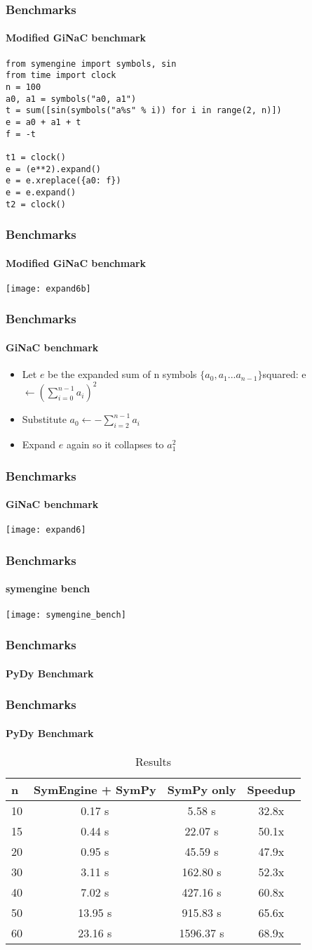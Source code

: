 \documentclass{beamer}
\begin{document}
\begin{frame}[fragile]
\frametitle{Benchmarks}
\framesubtitle{Modified GiNaC benchmark}
\begin{verbatim}
from symengine import symbols, sin
from time import clock
n = 100
a0, a1 = symbols("a0, a1")
t = sum([sin(symbols("a%s" % i)) for i in range(2, n)])
e = a0 + a1 + t
f = -t

t1 = clock()
e = (e**2).expand()
e = e.xreplace({a0: f})
e = e.expand()
t2 = clock()
\end{verbatim}
\end{frame}

\begin{frame}
\frametitle{Benchmarks}
\framesubtitle{Modified GiNaC benchmark}
\texttt{[image: expand6b]}
\end{frame}

\begin{frame}
\frametitle{Benchmarks}
\framesubtitle{GiNaC benchmark}
\begin{itemize}
\item Let $e$ be the expanded sum of n symbols $\{a_0, a_1 ... a_{n-1}\}$squared: e $\leftarrow (\sum_{i=0}^{n-1} a_i)^2$
\item Substitute $a_0 \leftarrow -\sum_{i=2}^{n-1} a_i$
\item Expand $e$ again so it collapses to $a_1^2$
\end{itemize}
\end{frame}

\begin{frame}
\frametitle{Benchmarks}
\framesubtitle{GiNaC benchmark}
\texttt{[image: expand6]}
\end{frame}

\begin{frame}
\frametitle{Benchmarks}
\framesubtitle{symengine bench}
\texttt{[image: symengine\_bench]}
\end{frame}


\begin{frame}
\frametitle{Benchmarks}
\framesubtitle{PyDy Benchmark}
\end{frame}


\begin{frame}
\frametitle{Benchmarks}
\framesubtitle{PyDy Benchmark}
\begin{table}
\begin{tabular}{l | c | c | c  }
n & SymEngine + SymPy & SymPy only & Speedup\\
\hline \hline
10 & 0.17 s & 5.58 s & 32.8x \\
15 & 0.44 s & 22.07 s & 50.1x \\
20 & 0.95 s & 45.59 s & 47.9x \\
30 & 3.11 s & 162.80 s & 52.3x \\
40 & 7.02 s & 427.16 s & 60.8x \\
50 & 13.95 s & 915.83 s & 65.6x \\
60 & 23.16 s & 1596.37 s & 68.9x
\end{tabular}
\caption{Results}
\end{table}
\end{frame}
\end{document}
